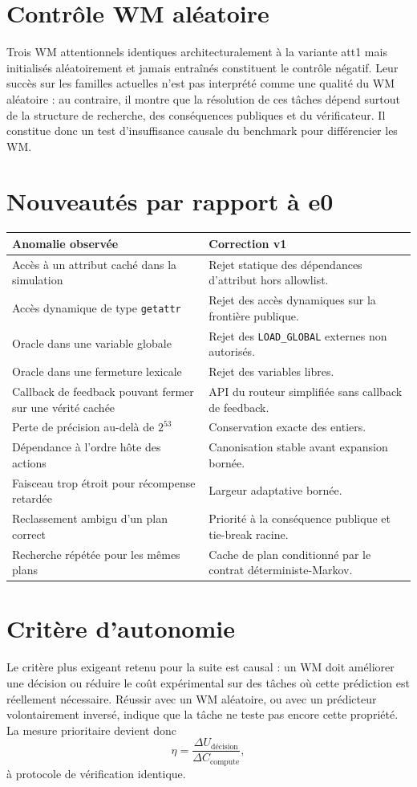\documentclass[11pt,a4paper]{article}
\begin{document}
\section{Contrôle WM aléatoire}
Trois WM attentionnels identiques architecturalement à la variante att1 mais initialisés aléatoirement et jamais entraînés constituent le contrôle négatif. Leur succès sur les familles actuelles n'est pas interprété comme une qualité du WM aléatoire : au contraire, il montre que la résolution de ces tâches dépend surtout de la structure de recherche, des conséquences publiques et du vérificateur. Il constitue donc un test d'insuffisance causale du benchmark pour différencier les WM.
\section{Nouveautés par rapport à e0}
\begin{longtable}{p{}p{}}
\toprule
Anomalie observée & Correction v1 \\
\midrule
Accès à un attribut caché dans la simulation & Rejet statique des dépendances d'attribut hors allowlist. \\
Accès dynamique de type \texttt{getattr} & Rejet des accès dynamiques sur la frontière publique. \\
Oracle dans une variable globale & Rejet des \texttt{LOAD\_GLOBAL} externes non autorisés. \\
Oracle dans une fermeture lexicale & Rejet des variables libres. \\
Callback de feedback pouvant fermer sur une vérité cachée & API du routeur simplifiée sans callback de feedback. \\
Perte de précision au-delà de $2^{53}$ & Conservation exacte des entiers. \\
Dépendance à l'ordre hôte des actions & Canonisation stable avant expansion bornée. \\
Faisceau trop étroit pour récompense retardée & Largeur adaptative bornée. \\
Reclassement ambigu d'un plan correct & Priorité à la conséquence publique et tie-break racine. \\
Recherche répétée pour les mêmes plans & Cache de plan conditionné par le contrat déterministe-Markov. \\
\bottomrule
\end{longtable}
\section{Critère d'autonomie}
Le critère plus exigeant retenu pour la suite est causal : un WM doit améliorer une décision ou réduire le coût expérimental sur des tâches où cette prédiction est réellement nécessaire. Réussir avec un WM aléatoire, ou avec un prédicteur volontairement inversé, indique que la tâche ne teste pas encore cette propriété. La mesure prioritaire devient donc
\[
\eta=\frac{\Delta U_{\text{décision}}}{\Delta C_{\text{compute}}},
\]
à protocole de vérification identique.
\end{document}
